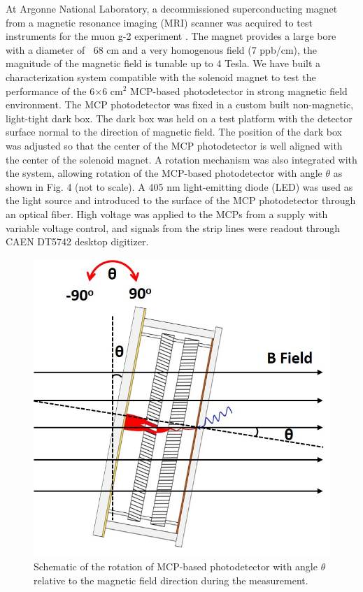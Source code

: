 \documentclass[preprint,5p]{elsarticle}
\begin{document}
At Argonne National Laboratory, a decommissioned superconducting magnet from a magnetic resonance imaging (MRI) scanner was acquired to test instruments for the muon g-2 experiment \cite{Magnet}. The magnet provides a large bore with a diameter of $~$ 68 cm and a very homogenous field (7 ppb/cm), the magnitude of the magnetic field is tunable up to 4 Tesla. We have built a characterization system compatible with the solenoid magnet to test the performance of the 6$\times$6 cm$^2$ MCP-based photodetector in strong magnetic field environment. The MCP photodetector was fixed in a custom built non-magnetic, light-tight dark box. The dark box was held on a test platform with the detector surface normal to the direction of magnetic field. The position of the dark box was adjusted so that the center of the MCP photodetector is well aligned with the center of the solenoid magnet. A rotation mechanism was also integrated with the system, allowing rotation of the MCP-based photodetector with angle $\theta$ as shown in Fig. 4 (not to scale). A 405 nm light-emitting diode (LED) was used as the light source and introduced to the surface of the MCP photodetector through an optical fiber. High voltage was applied to the MCPs from a supply with variable voltage control, and signals from the strip lines were readout through CAEN DT5742 desktop digitizer.

\begin{figure}[tbp]
\centering 
\includegraphics[scale=0.27]{fig/MCPs_theta_rotation.png}
\caption{Schematic of the rotation of MCP-based photodetector with angle $\theta$ relative to the magnetic field direction during the measurement.} 
\label{fig:MCPs_theta_rotation}
\end{figure}
\end{document}
